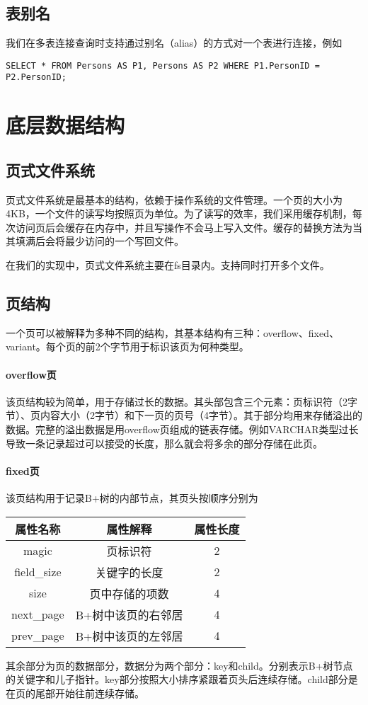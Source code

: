 \documentclass[10pt]{article}
\begin{document}
\subsection{表别名}
我们在多表连接查询时支持通过别名（alias）的方式对一个表进行连接，例如
\begin{verbatim}
SELECT * FROM Persons AS P1, Persons AS P2 WHERE P1.PersonID = P2.PersonID;
\end{verbatim}
\section{底层数据结构}
\subsection{页式文件系统}
页式文件系统是最基本的结构，依赖于操作系统的文件管理。一个页的大小为4KB，一个文件的读写均按照页为单位。为了读写的效率，我们采用缓存机制，每次访问页后会缓存在内存中，并且写操作不会马上写入文件。缓存的替换方法为当其填满后会将最少访问的一个写回文件。

在我们的实现中，页式文件系统主要在fs目录内。支持同时打开多个文件。
\subsection{页结构}
一个页可以被解释为多种不同的结构，其基本结构有三种：overflow、fixed、variant。每个页的前2个字节用于标识该页为何种类型。

\paragraph{overflow页} 该页结构较为简单，用于存储过长的数据。其头部包含三个元素：页标识符（2字节）、页内容大小（2字节）和下一页的页号（4字节）。其于部分均用来存储溢出的数据。完整的溢出数据是用overflow页组成的链表存储。例如VARCHAR类型过长导致一条记录超过可以接受的长度，那么就会将多余的部分存储在此页。

\paragraph{fixed页} 该页结构用于记录B+树的内部节点，其页头按顺序分别为
\begin{table}[H]
	\centering
	\begin{tabular}{|c|c|c|} \hline
		\textbf{属性名称} & \textbf{属性解释} & \textbf{属性长度} \\ \hline
		magic & 页标识符 & 2 \\ \hline
		field\_size & 关键字的长度 & 2 \\ \hline
		size & 页中存储的项数 & 4 \\ \hline
		next\_page & B+树中该页的右邻居 & 4 \\ \hline
		prev\_page & B+树中该页的左邻居 & 4 \\ \hline
	\end{tabular}
\end{table}
其余部分为页的数据部分，数据分为两个部分：key和child。分别表示B+树节点的关键字和儿子指针。key部分按照大小排序紧跟着页头后连续存储。child部分是在页的尾部开始往前连续存储。
\end{document}
